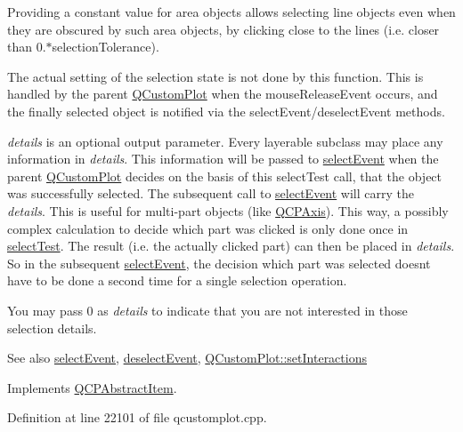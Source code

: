 Providing a constant value for area objects allows selecting line objects even when they are obscured by such area objects, by clicking close to the lines (i.\+e. closer than 0.$\ast$selection\+Tolerance).

The actual setting of the selection state is not done by this function. This is handled by the parent \hyperlink{class_q_custom_plot}{Q\+Custom\+Plot} when the mouse\+Release\+Event occurs, and the finally selected object is notified via the select\+Event/deselect\+Event methods.

{\itshape details} is an optional output parameter. Every layerable subclass may place any information in {\itshape details}. This information will be passed to \hyperlink{class_q_c_p_abstract_item_aaf92af7b9893712959a6c073d334d88d}{select\+Event} when the parent \hyperlink{class_q_custom_plot}{Q\+Custom\+Plot} decides on the basis of this select\+Test call, that the object was successfully selected. The subsequent call to \hyperlink{class_q_c_p_abstract_item_aaf92af7b9893712959a6c073d334d88d}{select\+Event} will carry the {\itshape details}. This is useful for multi-\/part objects (like \hyperlink{class_q_c_p_axis}{Q\+C\+P\+Axis}). This way, a possibly complex calculation to decide which part was clicked is only done once in \hyperlink{class_q_c_p_item_rect_af13b0797079b40b73d1c7286b76f18ac}{select\+Test}. The result (i.\+e. the actually clicked part) can then be placed in {\itshape details}. So in the subsequent \hyperlink{class_q_c_p_abstract_item_aaf92af7b9893712959a6c073d334d88d}{select\+Event}, the decision which part was selected doesn\textquotesingle{}t have to be done a second time for a single selection operation.

You may pass 0 as {\itshape details} to indicate that you are not interested in those selection details.

\begin{DoxySeeAlso}{See also}
\hyperlink{class_q_c_p_abstract_item_aaf92af7b9893712959a6c073d334d88d}{select\+Event}, \hyperlink{class_q_c_p_abstract_item_a91f090d6763cfedb0749219c63788ae9}{deselect\+Event}, \hyperlink{class_q_custom_plot_a5ee1e2f6ae27419deca53e75907c27e5}{Q\+Custom\+Plot\+::set\+Interactions} 
\end{DoxySeeAlso}


Implements \hyperlink{class_q_c_p_abstract_item_a96d522d10ffc0413b9a366c6f7f0476b}{Q\+C\+P\+Abstract\+Item}.



Definition at line 22101 of file qcustomplot.\+cpp.



